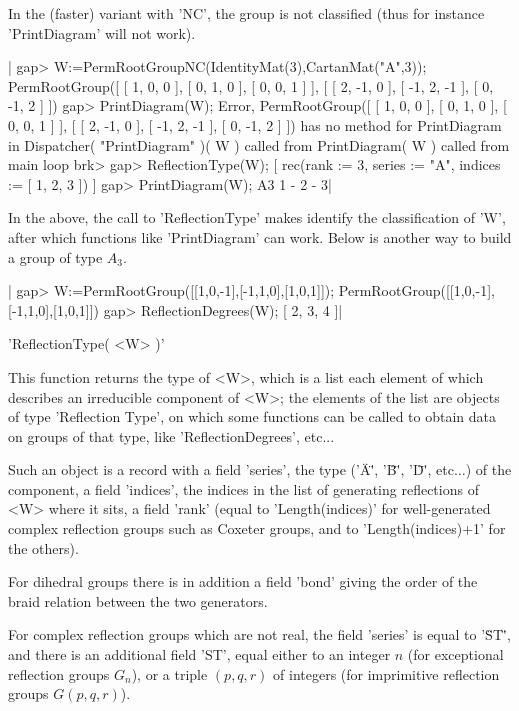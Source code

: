 In  the (faster) variant with  'NC', the group is  not classified (thus for
instance 'PrintDiagram' will not work).

|    gap> W:=PermRootGroupNC(IdentityMat(3),CartanMat("A",3));
    PermRootGroup([ [ 1, 0, 0 ], [ 0, 1, 0 ], [ 0, 0, 1 ] ],
      [ [ 2, -1, 0 ], [ -1, 2, -1 ], [ 0, -1, 2 ] ])
    gap> PrintDiagram(W);
    Error, PermRootGroup([ [ 1, 0, 0 ], [ 0, 1, 0 ], [ 0, 0, 1 ] ],
      [ [ 2, -1, 0 ], [ -1, 2, -1 ], [ 0, -1, 2 ] ]) has no method 
    for PrintDiagram in
    Dispatcher( "PrintDiagram" )( W ) called from
    PrintDiagram( W ) called from
    main loop
    brk> 
    gap> ReflectionType(W);
    [ rec(rank := 3,
          series := "A",
          indices := [ 1, 2, 3 ]) ]
    gap> PrintDiagram(W);
    A3       1 - 2 - 3|

In the above, the call  to 'ReflectionType' makes {\CHEVIE} identify the
classification  of 'W',  after which  functions like  'PrintDiagram' can
work. Below is another way to build a group of type $A_3$.

|    gap> W:=PermRootGroup([[1,0,-1],[-1,1,0],[1,0,1]]);
    PermRootGroup([[1,0,-1],[-1,1,0],[1,0,1]])
    gap> ReflectionDegrees(W);
    [ 2, 3, 4 ]|

%
%

'ReflectionType( <W> )'

This function returns the type of <W>, which is a list each element of which
describes an irreducible  component of <W>; the  elements of the list  are
objects of type 'Reflection Type', on which some functions can be called
to obtain data on groups of that type, like 'ReflectionDegrees', etc...

Such  an  object  is  a  record  with  a field 'series', the type ('\"A\"',
'\"B\"',  '\"D\"', etc$\ldots$)  of the  component, a  field 'indices', the
indices in the list of generating reflections of <W> where it sits, a field
'rank'  (equal to  'Length(indices)' for  well-generated complex reflection
groups such as Coxeter groups, and to 'Length(indices)+1' for the others).

For dihedral groups there is in addition a field 'bond' giving the order of
the braid relation between the two generators.

For  complex reflection  groups which  are not  real, the field 'series' is
equal  to '\"ST\"', and there is an  additional field 'ST', equal either to
an  integer  $n$  (for  exceptional  reflection  groups $G_n$), or a triple
$(p,q,r)$ of integers (for imprimitive reflection groups $G(p,q,r)$).

